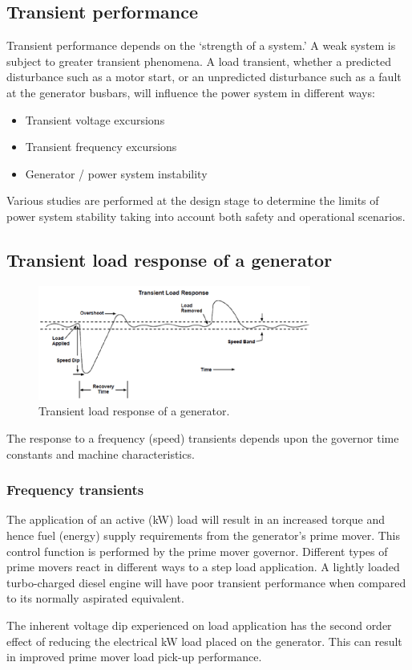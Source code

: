 \subsection{Transient performance}
Transient performance depends on the `strength of a system.' A weak system is subject to greater transient phenomena. A load transient, whether a predicted disturbance such as a motor start, or an unpredicted disturbance such as a fault at the generator busbars, will influence the power system in different ways:
\begin{itemize}
    \item Transient voltage excursions
    \item Transient frequency excursions
    \item Generator / power system instability
\end{itemize}
\begin{quoting}
    Various studies are performed at the design stage to determine the limits of power system stability taking into account both safety and operational scenarios.
\end{quoting}
\subsection{Transient load response of a generator}
\begin{figure}[H]
    \centering
    \includegraphics[width = 0.8\textwidth]{img/figure85.png}
    \caption{Transient load response of a generator.}
\end{figure}
The response to a frequency (speed) transients depends upon the governor time constants and machine characteristics.
\subsubsection{Frequency transients}
The application of an active (\si{\kilo\watt}) load will result in an increased torque and hence fuel (energy) supply requirements from the generator's prime mover. This control function is performed by the prime mover governor. Different types of prime movers react in different ways to a step load application. A lightly loaded turbo-charged diesel engine will have poor transient performance when compared to its normally aspirated equivalent.
\begin{quoting}
    The inherent voltage dip experienced on load application has the second order effect of reducing the electrical \si{\kilo\watt} load placed on the generator. This can result in improved prime mover load pick-up performance.
\end{quoting}
